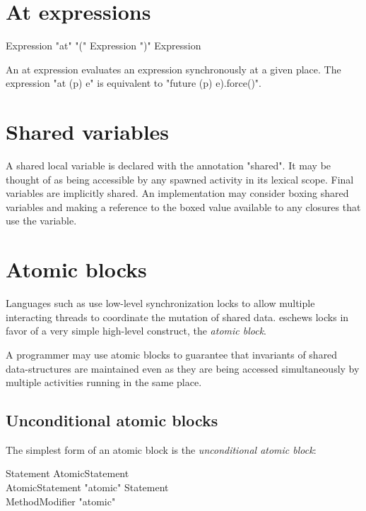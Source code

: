 \section{At expressions}

\begin{grammar}
Expression \: \xcd"at" \xcd"(" Expression \xcd")" Expression
\\
\end{grammar}

An at expression evaluates an expression synchronously at a given place.
The expression \xcd"at (p) e" is equivalent to \xcd"future (p) e).force()".

\section{Shared variables}
\label{Shared}

A shared local variable is declared with the annotation
\xcd"shared".  It may be thought of as being accessible by any spawned
activity in its lexical scope.  Final variables are implicitly
shared.  An implementation may consider boxing shared 
variables and making a reference to the boxed value available to
any closures that use the variable.

\section{Atomic blocks}\label{AtomicBlocks}
Languages such as \java{} use low-level synchronization locks to allow
multiple interacting threads to coordinate the mutation of shared
data. \Xten{} eschews locks in favor of a very simple high-level
construct, the {\em atomic block}.

A programmer may use atomic blocks to guarantee that invariants of
shared data-structures are maintained even as they are being accessed
simultaneously by multiple activities running in the same place.

\subsection{Unconditional atomic blocks}
The simplest form of an atomic block is the {\em unconditional
atomic block}:

\begin{grammar}
Statement \: AtomicStatement \\
AtomicStatement \: \xcd"atomic"  Statement \\
MethodModifier \: \xcd"atomic" \\
\end{grammar}

